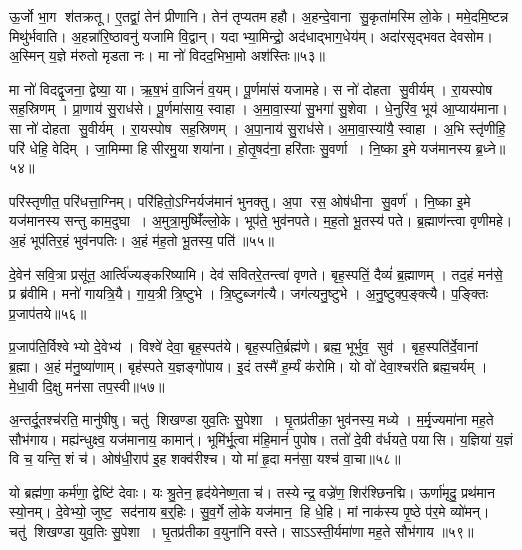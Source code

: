 ऊ॒र्जो भा॒ग श॑तक्रतू।
ए॒तद्वां॒ तेन॑ प्रीणानि।
तेन॑ तृप्यतमहहौ।
अ॒हन्दे॒वाना सु॒कृता॑मस्मि लो॒के।
ममे॒दमि॒ष्टन्न मिथु॑र्भवाति।
अ॒हन्ना॑रि॒ष्ठावनु॑ यजामि वि॒द्वान्।
यदाभ्या॒मिन्द्रो॒ अद॑धाद्भाग॒धेय॑म्।
अदा॑रसृद्भवत देवसोम।
अ॒स्मिन् य॒ज्ञे म॑रुतो मृडता नः।
मा नो॑ विदद॒भिभा॒मो अश॑स्तिः॥५३॥

मा नो॑ विदद्वृ॒जना॒ द्वेष्या॒ या।
ऋ॒ष॒भं वा॒जिनं॑ व॒यम्।
पू॒र्णमा॑सं यजामहे।
स नो॑ दोहता सु॒वीर्यम्।
रा॒यस्पोष सह॒स्रिणम्।
प्रा॒णाय॑ सु॒राध॑से।
पू॒र्णमा॑साय॒ स्वाहा।
अ॒मा॒वा॒स्या॑ सु॒भगा॑ सु॒शेवा।
धे॒नुरि॑व॒ भूय॑ आ॒प्याय॑माना।
सा नो॑ दोहता सु॒वीर्यम्।
रा॒यस्पोष सह॒स्रिणम्।
अ॒पा॒नाय॑ सु॒राध॑से।
अ॒मा॒वा॒स्या॑यै॒ स्वाहा।
अ॒भि स्तृ॑णीहि॒ परि॑ धेहि॒ वेदिम्।
जा॒मिम्मा हिसीरमु॒या शया॑ना।
हो॒तृ॒षद॑ना॒ हरि॑ताः सु॒वर्णा।
नि॒ष्का इ॒मे यज॑मानस्य ब्र॒ध्ने॥५४॥

परि॑स्तृणीत॒ परि॑धत्ता॒ग्निम्।
परि॑हितो॒ऽग्निर्यज॑मानं भुनक्तु।
अ॒पा रस॒ ओष॑धीना सु॒वर्ण॑।
नि॒ष्का इ॒मे यज॑मानस्य सन्तु काम॒दुघा।
अ॒मुत्रा॒मुष्मिँ॑ल्लो॒के।
भूप॑ते॒ भुव॑नपते।
म॒ह॒तो भू॒तस्य॑ पते।
ब्र॒ह्माण॑न्त्वा वृणीमहे।
अ॒हं भूप॑तिर॒हं भुव॑नपतिः।
अ॒हं म॑ह॒तो भू॒तस्य॒ पति॑॥५५॥

दे॒वेन॑ सवि॒त्रा प्रसू॑त॒ आर्त्वि॑ज्यङ्करिष्यामि।
देव॑ सवितरे॒तन्त्वा॑ वृणते।
बृह॒स्पतिं॒ दैव्यं॑ ब्र॒ह्माणम्।
तद॒हं मन॑से॒ प्र ब्र॑वीमि।
मनो॑ गायत्रि॒यै।
गा॒य॒त्री त्रि॒ष्टुभे।
त्रि॒ष्टुब्जग॑त्यै।
जग॑त्यनु॒ष्टुभे।
अ॒नु॒ष्टुक्प॒ङ्क्त्यै।
प॒ङ्क्तिः प्र॒जाप॑तये॥५६॥

प्र॒जाप॑ति॒र्विश्वेभ्यो दे॒वेभ्य॑।
विश्वे॑ देवा॒ बृह॒स्पत॑ये।
बृह॒स्पति॒र्ब्रह्म॑णे।
ब्रह्म॒ भूर्भुव॒ सुव॑।
बृह॒स्पति॑र्दे॒वानां ब्र॒ह्मा।
अ॒हं म॑नु॒ष्या॑णाम्।
बृह॑स्पते य॒ज्ञङ्गो॑पाय।
इ॒दं तस्मै॑ ह॒र्म्यं क॑रोमि।
यो वो॑ देवा॒श्चर॑ति ब्रह्म॒चर्यम्।
मे॒धा॒वी दि॒क्षु मन॑सा तप॒स्वी॥५७॥

अ॒न्तर्दू॒तश्च॑रति॒ मानु॑षीषु।
चतु॑ शिखण्डा युव॒तिः सु॒पेशा।
घृ॒तप्र॑तीका॒ भुव॑नस्य॒ मध्ये।
म॒र्मृ॒ज्यमा॑ना मह॒ते सौभ॑गाय।
मह्य॑न्धुक्ष्व॒ यज॑मानाय॒ कामान्॑।
भूमि॑र्भू॒त्वा म॑हि॒मानं॑ पुपोष।
ततो॑ दे॒वी व॑र्धयते॒ पयासि।
य॒ज्ञिया॑ य॒ज्ञं वि च॒ यन्ति॒ शं च॑।
ओष॑धी॒राप॑ इ॒ह शक्व॑रीश्च।
यो मा॑ हृ॒दा मन॑सा॒ यश्च॑ वा॒चा॥५८॥

यो ब्रह्म॑णा॒ कर्म॑णा॒ द्वेष्टि॑ देवाः।
यः श्रु॒तेन॒ हृद॑येनेष्ण॒ता च॑।
तस्येन्द्र॒ वज्रे॑ण॒ शिर॑श्छिनद्मि।
ऊर्णा॑मृदु॒ प्रथ॑मान स्यो॒नम्।
दे॒वेभ्यो॒ जुष्ट॒ सद॑नाय ब॒र्॒हिः।
सु॒व॒र्गे लो॒के यज॑मान॒ हि धे॒हि।
मां नाक॑स्य पृ॒ष्ठे प॑र॒मे व्यो॑मन्।
चतु॑ शिखण्डा युव॒तिः सु॒पेशा।
घृ॒तप्र॑तीका व॒युना॑नि वस्ते।
साऽऽस्ती॒र्यमा॑णा मह॒ते सौभ॑गाय ॥५९॥

